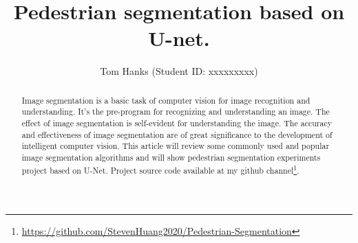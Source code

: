 \documentclass[12pt, a4paper]{article}
\title{Pedestrian segmentation based on U-net.}
\date{}
\author{Tom Hanks (Student ID: xxxxxxxxx)}
\begin{document}
	\maketitle
	\newpage
 	
	\begin{multicols}{2}
	\begin{abstract} \justify %
Image segmentation is a basic task of computer vision for image recognition and understanding. It’s the pre-program for recognizing and understanding an image. The effect of image segmentation is self-evident for understanding the image. The accuracy and effectiveness of image segmentation are of great significance to the development of intelligent computer vision. This article will review some commonly used and popular image segmentation algorithms and will show pedestrian segmentation experiments project based on U-Net. Project source code available at my github channel\footnote{\label{}\url{https://github.com/StevenHuang2020/Pedestrian-Segmentation}}.
	\end{abstract}

	\setlength{\lineskip}{3em}     %
	\setlength{\parskip}{0.5em}     %


\end{multicols}
\end{document}
